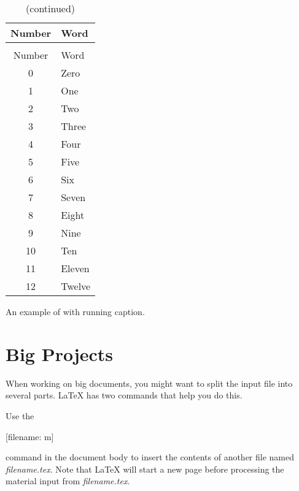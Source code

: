 \begin{listing}
  \begin{lined}{0.8\linewidth}
    \begin{example}[standalone,
    to_page=2,
    paperwidth=4.1cm,
    paperheight=4cm,
    vertical_pages,
]
\usepackage{longtable}
\usepackage{booktabs}


\begin{longtable}{@{}cl@{}}
  \caption{Numbers}       \\
  \toprule
  Number & Word           \\
  \midrule \endfirsthead

  \caption[]{(continued)} \\
  \toprule
  Number & Word           \\
  \midrule \endhead

  \bottomrule \endfoot
  \bottomrule \endlastfoot

  0      & Zero   \\
  1      & One    \\
  2      & Two     \\
  3      & Three \\
  4      & Four  \\
  5      & Five  \\
  6      & Six   \\
  7      & Seven \\
  8      & Eight \\
  9      & Nine  \\
  10     & Ten    \\
  11     & Eleven \\
  12     & Twelve \\
\end{longtable}
\end{example}
  \end{lined}
  \caption{An example of  with running caption.}\label{lst:longrunningcaption}
\end{listing}

\section{Big Projects}
When working on big documents, you might want to split the input file
into several parts. \LaTeX{} has two commands that help you do this.

Use the
\begin{lscommand}
  [filename: m]
\end{lscommand}
command in the document body to insert the contents of another file named
\emph{filename.tex}. Note that \LaTeX{} will start a new page before processing
the material input from \emph{filename.tex}.


